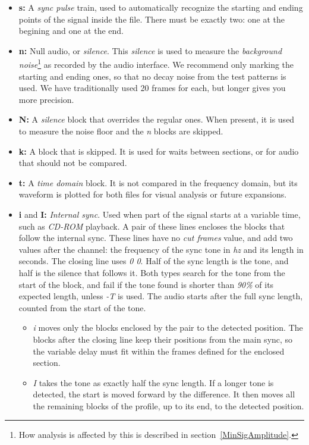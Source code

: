 \documentclass[10pt,a4paper]{report}
\newcommand{\ac}[1]{\textit{\mbox{\acrshort{#1}}}}
\begin{document}
\begin{appendices}
\begin{itemize}
	\item \textbf{s:} A \textit{sync pulse} train, used to automatically recognize the starting and ending points of the signal inside the file. There must be exactly two: one at the begining and one at the end.
	\item \textbf{n:} Null audio, or \textit{silence}. This \textit{silence} is used to measure the \textit{background noise}\footnote{How analysis is affected by this is described in section~\ref{MinSigAmplitude}.} as recorded by the audio interface. We recommend only marking the starting and ending ones, so that no decay noise from the test patterns is used. We have traditionally used 20 frames for each, but longer gives you more precision.
	\item \textbf{N:} A \textit{silence} block that overrides the regular ones. When present, it is used to measure the noise floor and the \textit{n} blocks are skipped.
	\item \textbf{k:} A block that is skipped. It is used for waits between sections, or for audio that should not be compared.
	\item \textbf{t:} A \textit{time domain} block. It is not compared in the frequency domain, but its waveform is plotted for both files for visual analysis or future expansions.
	\item \textbf{i} and \textbf{I:} \textit{Internal sync}. Used when part of the signal starts at a variable time, such as \textit{CD-ROM} playback. A pair of these lines encloses the blocks that follow the internal sync. These lines have no \textit{cut frames} value, and add two values after the channel: the frequency of the sync tone in \ac{hz} and its length in seconds. The closing line uses \textit{0 0}. Half of the sync length is the tone, and half is the silence that follows it. Both types search for the tone from the start of the block, and fail if the tone found is shorter than \textit{90\%} of its expected length, unless \textit{-T} is used. The audio starts after the full sync length, counted from the start of the tone.

\begin{itemize}
	\item \textit{i} moves only the blocks enclosed by the pair to the detected position. The blocks after the closing line keep their positions from the main sync, so the variable delay must fit within the frames defined for the enclosed section.
	\item \textit{I} takes the tone as exactly half the sync length. If a longer tone is detected, the start is moved forward by the difference. It then moves all the remaining blocks of the profile, up to its end, to the detected position.
\end{itemize}


\end{itemize}
\end{appendices}
\end{document}
